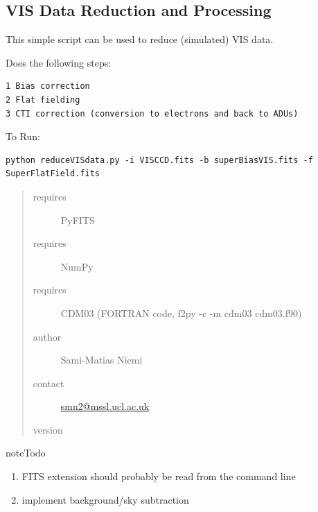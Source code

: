 \documentclass[a4paper,12pt,english]{sphinxmanual}
\begin{document}
\subsection{VIS Data Reduction and Processing}
\label{reduction:vis-data-reduction-and-processing}
This simple script can be used to reduce (simulated) VIS data.

Does the following steps:

\begin{Verbatim}[commandchars=\\\{\}]
1 Bias correction
2 Flat fielding
3 CTI correction (conversion to electrons and back to ADUs)
\end{Verbatim}

To Run:

\begin{Verbatim}[commandchars=\\\{\}]
python reduceVISdata.py -i VISCCD.fits -b superBiasVIS.fits -f SuperFlatField.fits
\end{Verbatim}
\begin{quote}\begin{description}
\item[{requires}] \leavevmode
PyFITS

\item[{requires}] \leavevmode
NumPy

\item[{requires}] \leavevmode
CDM03 (FORTRAN code, f2py -c -m cdm03 cdm03.f90)

\item[{author}] \leavevmode
Sami-Matias Niemi

\item[{contact}] \leavevmode
\href{mailto:smn2@mssl.ucl.ac.uk}{smn2@mssl.ucl.ac.uk}

\item[{version}] 

\end{description}\end{quote}

\begin{notice}{note}{Todo}
\begin{enumerate}
\item {} 
FITS extension should probably be read from the command line

\item {} 
implement background/sky subtraction

\end{enumerate}
\end{notice}
\end{document}
